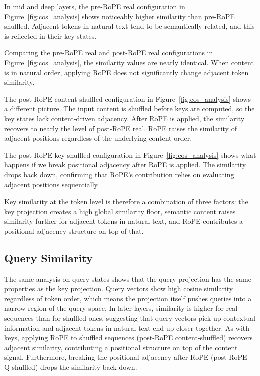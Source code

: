 In mid and deep layers, the pre-RoPE real configuration in Figure~\ref{fig:cos_analysis} shows noticeably higher similarity than pre-RoPE shuffled.
Adjacent tokens in natural text tend to be semantically related, and this is reflected in their key states.

Comparing the pre-RoPE real and post-RoPE real configurations in Figure~\ref{fig:cos_analysis}, the similarity values are nearly identical.
When content is in natural order, applying RoPE does not significantly change adjacent token similarity.

The post-RoPE content-shuffled configuration in Figure~\ref{fig:cos_analysis} shows a different picture.
The input content is shuffled before keys are computed, so the key states lack content-driven adjacency.
After RoPE is applied, the similarity recovers to nearly the level of post-RoPE real.
RoPE raises the similarity of adjacent positions regardless of the underlying content order.

The post-RoPE key-shuffled configuration in Figure~\ref{fig:cos_analysis} shows what happens if we break positional adjacency after RoPE is applied. The similarity drops back down, confirming that RoPE's contribution relies on evaluating adjacent positions sequentially.

Key similarity at the token level is therefore a combination of three factors: the key projection creates a high global similarity floor, semantic content raises similarity further for adjacent tokens in natural text, and RoPE contributes a positional adjacency structure on top of that.

\subsection{Query Similarity}

The same analysis on query states shows that the query projection has the same properties as the key projection.
Query vectors show high cosine similarity regardless of token order, which means the projection itself pushes queries into a narrow region of the query space.
In later layers, similarity is higher for real sequences than for shuffled ones, suggesting that query vectors pick up contextual information and adjacent tokens in natural text end up closer together.
As with keys, applying RoPE to shuffled sequences (post-RoPE content-shuffled) recovers adjacent similarity, contributing a positional structure on top of the content signal. Furthermore, breaking the positional adjacency after RoPE (post-RoPE Q-shuffled) drops the similarity back down.

